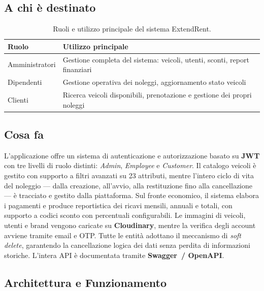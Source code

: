 \documentclass[12pt, a4paper]{article}
\begin{document}
    \subsection*{A chi è destinato}

    \begin{table}[H]
        \centering
        \begin{tabular}{ll}
            \toprule
            \textbf{Ruolo} & \textbf{Utilizzo principale} \\
            \midrule
            Amministratori & Gestione completa del sistema: veicoli, utenti,
            sconti, report finanziari \\
            \midrule
            Dipendenti     & Gestione operativa dei noleggi, aggiornamento stato
            veicoli \\
            \midrule
            Clienti        & Ricerca veicoli disponibili, prenotazione e gestione
            dei propri noleggi \\
            \bottomrule
        \end{tabular}
        \caption{Ruoli e utilizzo principale del sistema ExtendRent.}
        \label{tab:ruoli}
    \end{table}

    \subsection*{Cosa fa}

    L'applicazione offre un sistema di autenticazione e autorizzazione basato su
    \textbf{JWT} con tre livelli di ruolo distinti: \emph{Admin}, \emph{Employee}
    e \emph{Customer}. Il catalogo veicoli è gestito con supporto a filtri avanzati
    su 23 attributi, mentre l'intero ciclo di vita del noleggio — dalla creazione,
    all'avvio, alla restituzione fino alla cancellazione — è tracciato e gestito
    dalla piattaforma. Sul fronte economico, il sistema elabora i pagamenti e
    produce reportistica dei ricavi mensili, annuali e totali, con supporto a
    codici sconto con percentuali configurabili. Le immagini di veicoli, utenti e
    brand vengono caricate su \textbf{Cloudinary}, mentre la verifica degli account
    avviene tramite email e OTP. Tutte le entità adottano il meccanismo di
    \emph{soft delete}, garantendo la cancellazione logica dei dati senza perdita
    di informazioni storiche. L'intera API è documentata tramite
    \textbf{Swagger~/ OpenAPI}.

    \subsection{Architettura e Funzionamento}
\end{document}
